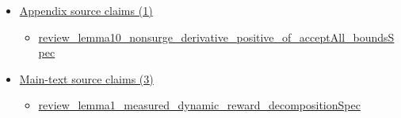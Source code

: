 \documentclass[10pt]{article}
\begin{document}
\begin{itemize}[leftmargin=1.2em]
\begin{itemize}[leftmargin=1.2em]
\item \hyperlink{paper-prerequisite-d9323f0e5caa6a53}{GN21\allowbreak{}Driver\allowbreak{}Surge\allowbreak{}Pricing.\allowbreak{}Proof\allowbreak{}Bridge.\allowbreak{}GN21\allowbreak{}Lemma5\allowbreak{}AE\allowbreak{}Null\allowbreak{}Endpoint\allowbreak{}Variation}
\item \hyperlink{paper-prerequisite-a6cc9c4b5d87298b}{GN21\allowbreak{}Driver\allowbreak{}Surge\allowbreak{}Pricing.\allowbreak{}gn21\allowbreak{}Time\allowbreak{}Fraction\allowbreak{}IID\allowbreak{}Cycle\allowbreak{}Model\_\allowbreak{}of\_\allowbreak{}actual\allowbreak{}Calendar}
\item \hyperlink{paper-prerequisite-bf3acf87e3f7722d}{GN21\allowbreak{}Driver\allowbreak{}Surge\allowbreak{}Pricing.\allowbreak{}gn21\allowbreak{}Dynamic\allowbreak{}IID\allowbreak{}Cycle\allowbreak{}Model\_\allowbreak{}of\_\allowbreak{}actual\allowbreak{}Calendar}
\item \hyperlink{paper-prerequisite-28a97f81b0e6d592}{GN21\allowbreak{}Driver\allowbreak{}Surge\allowbreak{}Pricing.\allowbreak{}paper\_\allowbreak{}lemma1\_\allowbreak{}stochastic\_\allowbreak{}dynamic\_\allowbreak{}reward\_\allowbreak{}decomposition\_\allowbreak{}of\_\allowbreak{}actual\_\allowbreak{}calendar}
\item \hyperlink{paper-prerequisite-16a9870fd097140a}{GN21\allowbreak{}Driver\allowbreak{}Surge\allowbreak{}Pricing.\allowbreak{}paper\_\allowbreak{}lemma3\_\allowbreak{}stochastic\_\allowbreak{}time\_\allowbreak{}fraction\_\allowbreak{}formula\_\allowbreak{}of\_\allowbreak{}actual\_\allowbreak{}calendar}
\end{itemize}
\item \hyperlink{source-section-fc0f8ef37eccf87b}{Appendix source claims (1)}
\begin{itemize}[leftmargin=1.2em]
\item \hyperlink{source-claim-7650473d990d95c0}{review\_\allowbreak{}lemma10\_\allowbreak{}nonsurge\_\allowbreak{}derivative\_\allowbreak{}positive\_\allowbreak{}of\_\allowbreak{}accept\allowbreak{}All\_\allowbreak{}bounds\allowbreak{}Spec}
\end{itemize}
\item \hyperlink{source-section-0c7af8265958a9ea}{Main-text source claims (3)}
\begin{itemize}[leftmargin=1.2em]
\item \hyperlink{source-claim-0847fd2171fe1fa6}{review\_\allowbreak{}lemma1\_\allowbreak{}measured\_\allowbreak{}dynamic\_\allowbreak{}reward\_\allowbreak{}decomposition\allowbreak{}Spec}

\end{itemize}
\end{itemize}
\end{document}
